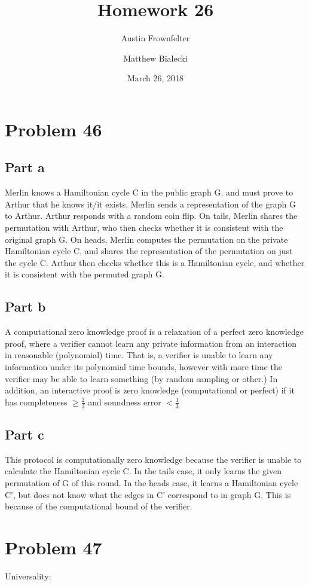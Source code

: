 \documentclass{article}
\title{Homework 26}
\author{Austin Frownfelter \and Matthew Bialecki}
\date{March 26, 2018}
\begin{document}
\maketitle

\section{Problem 46}
\subsection{Part a}
Merlin knows a Hamiltonian cycle C in the public graph G, and must prove to Arthur that he knows it/it exists.  Merlin sends a representation of the graph G to Arthur.  Arthur responds with a random coin flip.  On tails, Merlin shares the permutation with Arthur, who then checks whether it is consistent with the original graph G.  On heads, Merlin computes the permutation on the private Hamiltonian cycle C, and shares the representation of the permutation on just the cycle C.  Arthur then checks whether this is a Hamiltonian cycle, and whether it is consistent with the permuted graph G.

\subsection{Part b}
A computational zero knowledge proof is a relaxation of a perfect zero knowledge proof, where a verifier cannot learn any private information from an interaction in reasonable (polynomial) time.  That is, a verifier is unable to learn any information under its polynomial time bounds, however with more time the verifier may be able to learn something (by random sampling or other.)  In addition, an interactive proof is zero knowledge (computational or perfect) if it has completeness $\geq \frac23$ and soundness error $< \frac13$

\subsection{Part c}
This protocol is computationally zero knowledge because the verifier is unable to calculate the Hamiltonian cycle C.  In the tails case, it only learns the given permutation of G of this round.  In the heads case, it learns a Hamiltonian cycle C', but does not know what the edges in C' correspond to in graph G.  This is because of the computational bound of the verifier.


\section{Problem 47}
Universality:
\end{document}
